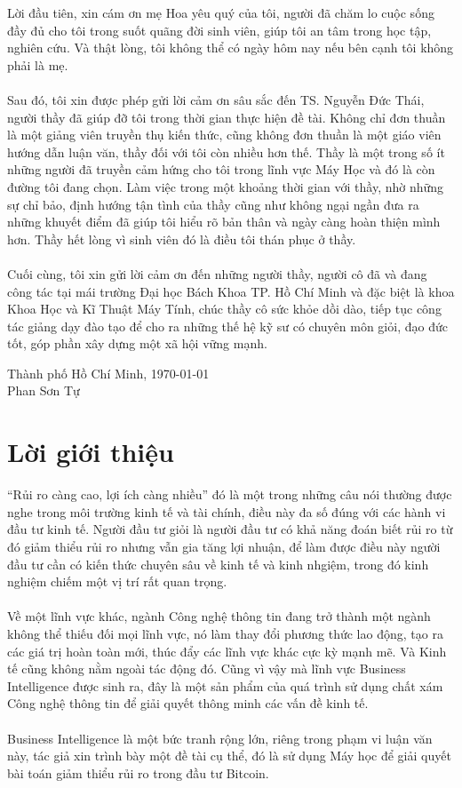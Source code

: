 Lời đầu tiên, xin cám ơn mẹ Hoa yêu quý của tôi, người đã chăm lo cuộc
sống đầy đủ cho tôi trong suốt quãng đời sinh viên, giúp tôi an tâm trong học
tập, nghiên cứu. Và thật lòng, tôi không thể có ngày hôm nay nếu bên 
cạnh tôi không phải là mẹ.\\\\
Sau đó, tôi xin được phép gửi lời cảm ơn sâu sắc đến TS. Nguyễn Đức Thái,
người thầy đã giúp đỡ tôi trong thời gian thực hiện đề tài.
Không chỉ đơn thuần là một giảng viên truyền thụ kiến thức, cũng không đơn thuần
là một giáo viên hướng dẫn luận văn, thầy đối với tôi còn nhiều hơn thế. Thầy là
một trong số ít những người đã truyền cảm hứng cho tôi trong lĩnh vực Máy Học 
và đó là còn đường tôi đang chọn. Làm việc trong một khoảng thời gian với thầy, 
nhờ những sự chỉ bảo, định hướng tận tình của thầy cũng như không ngại ngần đưa 
ra những khuyết điểm đã giúp tôi hiểu rõ bản thân và ngày càng hoàn thiện mình 
hơn. Thầy hết lòng vì sinh viên đó là điều tôi thán phục ở thầy.\\\\
Cuối cùng, tôi xin gửi lời cảm ơn đến những người thầy, người cô đã và đang công tác
tại mái trường Đại học Bách Khoa TP. Hồ Chí Minh và đặc biệt là khoa Khoa Học và
Kĩ Thuật Máy Tính, chúc thầy cô sức khỏe dồi dào, tiếp tục công tác giảng dạy
đào tạo để cho ra những thế hệ kỹ sư có chuyên môn giỏi, đạo đức tốt, góp phần
 xây dựng một xã hội vững mạnh.
 \vspace{2cm}
 \begin{flushright}
 Thành phố Hồ Chí Minh, \MakeLowercase{\today}\\ 
Phan Sơn Tự\\
 \end{flushright}
\pagebreak

\section*{Lời giới thiệu}
\thispagestyle{plain} 
``Rủi ro càng cao, lợi ích càng nhiều'' đó là một trong những câu nói thường
được nghe trong môi trường kinh tế và tài chính, điều này đa số đúng với các hành vi đầu tư
kinh tế. Người đầu tư giỏi là người đầu tư có khả năng đoán biết rủi ro từ đó
giảm thiểu rủi ro nhưng vẫn gia tăng lợi nhuận, để làm được điều này người
đầu tư cần có kiến thức chuyên sâu về kinh tế và kinh nhgiệm, trong đó kinh 
nghiệm chiếm một vị trí rất quan trọng.\\\\
Về một lĩnh vực khác, ngành Công nghệ thông tin đang trở thành một ngành không 
thể thiếu đối mọi lĩnh vực, nó làm thay đổi phương thức lao động, tạo ra các 
giá trị hoàn toàn mới, thúc đẩy các lĩnh vực khác cực kỳ mạnh mẽ. Và Kinh tế 
cũng không nằm ngoài tác động đó. Cũng vì vậy mà lĩnh vực Business Intelligence
được sinh ra, đây là một sản phẩm của quá trình sử dụng chất xám Công nghệ 
thông tin để giải quyết thông minh các vấn đề kinh tế.\\\\
Business Intelligence là một bức tranh rộng lớn, riêng trong phạm vi luận văn 
này, tác giả xin trình bày một đề tài cụ thể, đó là sử dụng Máy học để 
giải quyết bài toán giảm thiểu rủi ro trong đầu tư Bitcoin.
\pagebreak